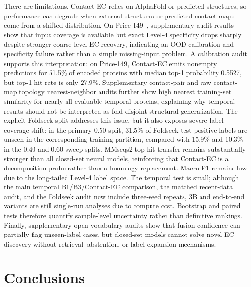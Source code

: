 \documentclass[numbered,contemporary,mediumone]{oup-authoring-template}
\begin{document}
There are limitations. Contact-EC relies on AlphaFold or predicted structures, so
performance can degrade when external structures or predicted contact maps come
from a shifted distribution. On Price-149~\citep{price2018}, supplementary audit results show that
input coverage is available but exact Level-4 specificity drops sharply despite
stronger coarse-level EC recovery, indicating an OOD calibration and specificity
failure rather than a simple missing-input problem. A calibration audit supports
this interpretation: on Price-149, Contact-EC emits nonempty predictions for
51.5\% of encoded proteins with median top-1 probability 0.5527, but top-1
hit rate is only 27.9\%. Supplementary contact-pair and raw contact-map topology
nearest-neighbor audits further show high nearest training-set similarity for
nearly all evaluable temporal proteins, explaining why temporal results should
not be interpreted as fold-disjoint structural generalization. The explicit
Foldseek split addresses this issue, but it also exposes severe label-coverage
shift: in the primary 0.50 split, 31.5\% of Foldseek-test positive labels are
unseen in the corresponding training partition, compared with 15.9\% and 10.3\%
in the 0.40 and 0.60 sweep splits. MMseqs2 top-hit transfer remains
substantially stronger than all closed-set neural models, reinforcing that
Contact-EC is a decomposition probe rather than a homology replacement. Macro F1 remains low due to the long-tailed Level-4 label
space. The temporal test is small; although the main temporal B1/B3/Contact-EC
comparison, the matched recent-data audit, and the Foldseek audit now include
three-seed repeats, 3B and end-to-end variants are still single-run analyses due
to compute cost. Bootstrap and
paired tests therefore quantify sample-level uncertainty rather than definitive
rankings. Finally, supplementary open-vocabulary audits show that fusion confidence
can partially flag unseen-label cases, but closed-set models cannot solve novel EC
discovery without retrieval, abstention, or label-expansion mechanisms.

\section{Conclusions}
\end{document}
